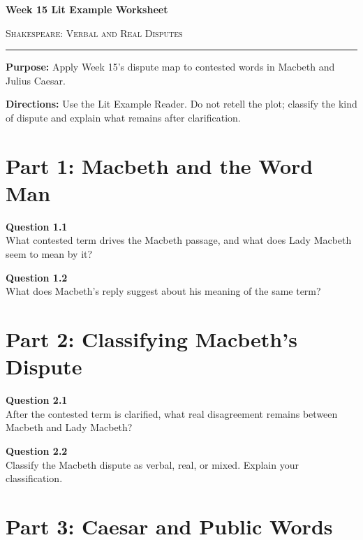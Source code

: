 \documentclass[12pt]{article}
\begin{document}
\begin{center}
{\LARGE\bfseries Week 15 Lit Example Worksheet}\par\vspace{0.05em}
{\large\scshape Shakespeare: Verbal and Real Disputes}\par\vspace{0.12em}
\rule{0.78\textwidth}{0.5pt}
\end{center}

\textbf{Purpose:} Apply Week 15's dispute map to contested words in Macbeth and Julius Caesar.

\textbf{Directions:} Use the Lit Example Reader. Do not retell the plot; classify the kind of dispute and explain what remains after clarification.

\section*{Part 1: Macbeth and the Word Man}

\textbf{Question 1.1}\\[-0.15em]
What contested term drives the Macbeth passage, and what does Lady Macbeth seem to mean by it?


\textbf{Question 1.2}\\[-0.15em]
What does Macbeth's reply suggest about his meaning of the same term?


\newpage

\section*{Part 2: Classifying Macbeth's Dispute}

\textbf{Question 2.1}\\[-0.15em]
After the contested term is clarified, what real disagreement remains between Macbeth and Lady Macbeth?


\textbf{Question 2.2}\\[-0.15em]
Classify the Macbeth dispute as verbal, real, or mixed. Explain your classification.


\newpage

\section*{Part 3: Caesar and Public Words}
\end{document}
